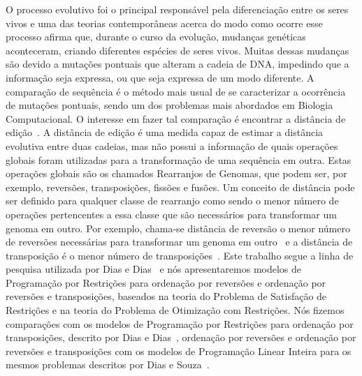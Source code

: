 O processo evolutivo foi o principal responsável pela diferenciação
entre os seres vivos e uma das teorias contemporâneas acerca do modo
como ocorre esse processo afirma que, durante o curso da evolução,
mudanças genéticas aconteceram, criando diferentes espécies de seres
vivos. Muitas dessas mudanças são devido a mutações pontuais que
alteram a cadeia de DNA, impedindo que a informação seja expressa, ou
que seja expressa de um modo diferente. A comparação de sequência é o
método mais usual de se caracterizar a ocorrência de mutações
pontuais, sendo um dos problemas mais abordados em Biologia
Computacional. O interesse em fazer tal comparação é encontrar a
distância de edição~\cite{SetubalMeidanis*1997}. A distância de edição
é uma medida capaz de estimar a distância evolutiva entre duas
cadeias, mas não possui a informação de quais operações globais foram
utilizadas para a transformação de uma sequência em outra. Estas
operações globais são os chamados Rearranjos de Genomas, que podem
ser, por exemplo, reversões, transposições, fissões e fusões. Um
conceito de distância pode ser definido para qualquer classe de
rearranjo como sendo o menor número de operações pertencentes a essa
classe que são necessários para transformar um genoma em outro. Por
exemplo, chama-se distância de reversão o menor número de reversões
necessárias para transformar um genoma em
outro~\cite{BafnaPevzner*1996} e a distância de transposição é o menor
número de transposições~\cite{BafnaPevzner*1998}. Este trabalho segue
a linha de pesquisa utilizada por Dias e Dias~\cite{DiasDias*2009} e
nós apresentaremos modelos de Programação por Restrições para
ordenação por reversões e ordenação por reversões e transposições,
baseados na teoria do Problema de Satisfação de Restrições e na teoria
do Problema de Otimização com Restrições. Nós fizemos comparações com
os modelos de Programação por Restrições para ordenação por
transposições, descrito por Dias e Dias~\cite{DiasDias*2009},
ordenação por reversões e ordenação por reversões e transposições com
os modelos de Programação Linear Inteira para os mesmos problemas
descritos por Dias e Souza~\cite{DiasSouza*2007}.
